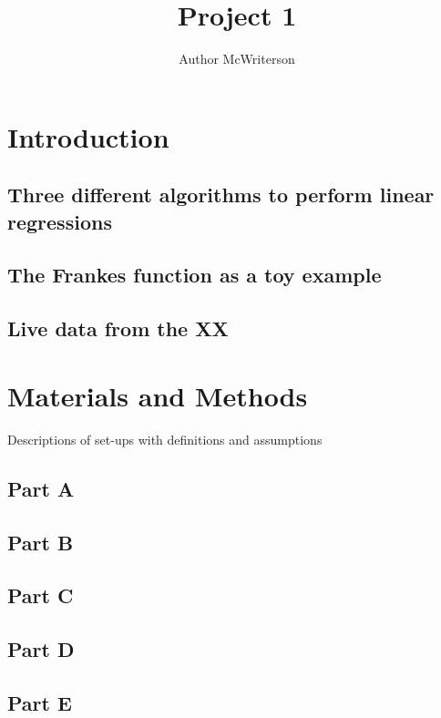 \documentclass[a4paper, 11pt]{article}
\title{Project 1}
\author{Author McWriterson}
\begin{document}
\maketitle
\tableofcontents

\begin{abstract}
\end{abstract}

\pagebreak

\section{Introduction}

\subsection{Three different algorithms to perform linear regressions}
\subsection{The Frankes function as a toy example}
\subsection{Live data from the XX}

\pagebreak

\section{Materials and Methods}

Descriptions of set-ups with definitions and assumptions

\subsection{Part A}
\subsection{Part B}
\subsection{Part C}
\subsection{Part D}
\subsection{Part E}
\end{document}
